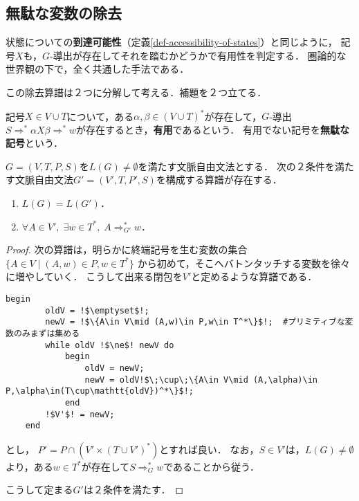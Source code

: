 \subsection{無駄な変数の除去}

\begin{tcolorbox}[colframe=ForestGreen, colback=ForestGreen!10!white, breakable]
    状態についての\textbf{到達可能性}（定義\ref{def-accessibility-of-states}）と同じように，
    記号$X$も，$G$-導出が存在してそれを踏むかどうかで有用性を判定する．
    圏論的な世界観の下で，全く共通した手法である．

    この除去算譜は２つに分解して考える．補題を２つ立てる．
\end{tcolorbox}

\begin{definition}[usefulness]
    記号$X\in V\cup T$について，ある$\alpha,\beta\in(V\cup T)^*$が存在して，$G$-導出$S\Rightarrow^*\alpha X\beta\Rightarrow^*w$が存在するとき，\textbf{有用}であるという．
    有用でない記号を\textbf{無駄な記号}という．
\end{definition}

\begin{lemma}[終端記号を導出しない変数の除去算譜]\label{lemma-algorithm1-unuseful-characters}
    $G=(V,T,P,S)$を$L(G)\ne\emptyset$を満たす文脈自由文法とする．
    次の２条件を満たす文脈自由文法$G'=(V',T,P',S)$を構成する算譜が存在する．
    \begin{enumerate}
        \item $L(G)=L(G')$．
        \item $\forall A\in V',\;\exists w\in T^*,\;A\Rightarrow^*_{G'}w$．
    \end{enumerate}
\end{lemma}
\begin{proof}
    次の算譜は，明らかに終端記号を生む変数の集合$\{A\in V\mid (A,w)\in P,w\in T^*\}$
    から初めて，そこへバトンタッチする変数を徐々に増やしていく．
    こうして出来る閉包を$V'$と定めるような算譜である．
    \begin{lstlisting}[escapechar=!]
    begin
        oldV = !$\emptyset$!;
        newV = !$\{A\in V\mid (A,w)\in P,w\in T^*\}$!;  #プリミティブな変数のみまずは集める
        while oldV !$\ne$! newV do
            begin
                oldV = newV;
                newV = oldV!$\;\cup\;\{A\in V\mid (A,\alpha)\in P,\alpha\in(T\cup\mathtt{oldV})^*\}$!;
            end
        !$V'$! = newV;
    end
    \end{lstlisting}
    とし，
    $P'=P\cap(V'\times(T\cup V')^*)$とすれば良い．
    なお，$S\in V'$は，$L(G)\ne\emptyset$より，ある$w\in T^*$が存在して$S\Rightarrow^*_{G} w$であることから従う．

    こうして定まる$G'$は２条件を満たす．
\end{proof}

